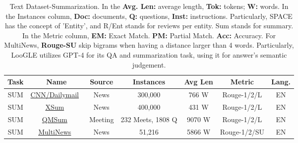 \begin{table*}[]
    \centering
    \caption{Text Dataset-Summarization. In the \textbf{Avg. Len: }  average length, \textbf{Tok:}  tokens;  \textbf{W: } words. In the Instances column, \textbf{Doc:} documents, \textbf{Q:} questions, \textbf{Inst:} instructions. Particularly, SPACE has the concept of 'Entity', and R/Ent stands for reviews per entity. Sum stands for summary.  
    In the Metric column, \textbf{EM:} Exact Match. \textbf{PM:} Partial Match. \textbf{Acc:} Accuracy. 
    For MultiNews, \textbf{Rouge-SU} skip bigrams when having a distance larger than 4 words. Particularly, LooGLE utilizes GPT-4 for its QA and summarization task, using it for answer's semantic judgement.}
    \renewcommand{\arraystretch}{1.3} %
    \setlength{\tabcolsep}{1pt} %
    \label{tab:text-dataset-summarization}

\begin{tabular}{c|c|c|c|c|c|c}
\hline
\textbf{Task} &
  \textbf{Name} &
  \textbf{Source} &
  \textbf{Instances} &
  \textbf{Avg Len} &
  \textbf{Metric} &
  \textbf{Lang.} \\ \hline
 SUM& 
\href{https://huggingface.co/datasets/ccdv/cnn_dailymail}{CNN/Dailymail}~\cite{nallapati_abstractive_dailymail_2016}& News& 
300,000& 
766 W& 
Rouge-1/2/L&
EN\\ \hline
 SUM
 & \href{https://huggingface.co/datasets/EdinburghNLP/xsum}{XSum}~\cite{narayan_dont_xsum_2018}
 & News
 & 400,000
 & 431 W
 & Rouge-1/2/L
 &EN\\ \hline
 SUM
 & \href{https://github.com/Yale-LILY/QMSum}{QMSum}~\cite{zhong_qmsum:_2021}
 & Meeting
 & 232 Meets, 1808 Q
 & 9070 W
 & Rouge-1/2/L
 &EN\\  \hline
 SUM
 & \href{https://github.com/Alex-Fabbri/Multi-News}{MultiNews}~\cite{fabbri_multi-news:_2019}
 & News
 & 51,216
 & 5866 W %
 & Rouge-1/2/SU
 &EN\\ \hline
 

\end{tabular}
\end{table*}
